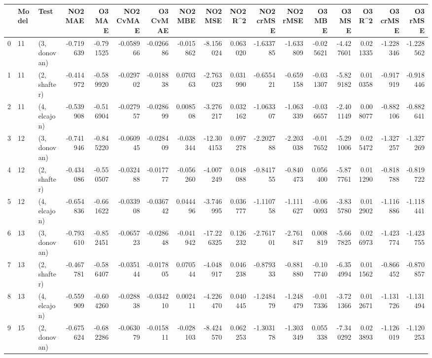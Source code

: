 \begin{tabular}{lllrrrrrrrrrrrrrr}
\toprule
{} & Model &          Test &   NO2 MAE &    O3 MAE &  NO2 CvMAE &  O3 CvMAE &   NO2 MBE &    NO2 MSE &   NO2 R\textasciicircum2 &  NO2 crMSE &  NO2 rMSE &    O3 MBE &     O3 MSE &    O3 R\textasciicircum2 &  O3 crMSE &   O3 rMSE \\
\midrule
0  &    11 &  (3, donovan) & -0.719639 & -0.791525 &  -0.058966 & -0.026686 & -0.015862 &  -8.156024 &  0.063020 &  -1.633785 & -1.633809 & -0.025621 &  -4.427601 &  0.021335 & -1.228346 & -1.228562 \\
1  &    11 &  (2, shafter) & -0.414972 & -0.589920 &  -0.029702 & -0.018838 &  0.070363 &  -2.763023 &  0.031990 &  -0.655421 & -0.659158 & -0.031307 &  -5.829182 &  0.010358 & -0.917919 & -0.918446 \\
2  &    11 &  (4, elcajon) & -0.539908 & -0.516904 &  -0.027957 & -0.028699 &  0.008508 &  -3.276217 &  0.032162 &  -1.063307 & -1.063339 & -0.036657 &  -2.401149 &  0.008077 & -0.882106 & -0.882641 \\
3  &    12 &  (3, donovan) & -0.741946 & -0.845220 &  -0.060945 & -0.028409 & -0.038344 & -12.304153 &  0.097278 &  -2.202788 & -2.203038 & -0.017652 &  -5.291006 &  0.025472 & -1.327257 & -1.327269 \\
4  &    12 &  (2, shafter) & -0.434086 & -0.550507 &  -0.032488 & -0.017777 & -0.056260 &  -4.007249 &  0.048088 &  -0.841755 & -0.840473 &  0.056400 &  -5.877761 &  0.011290 & -0.818788 & -0.819722 \\
5  &    12 &  (4, elcajon) & -0.654836 & -0.661622 &  -0.033908 & -0.036742 &  0.044496 &  -3.746995 &  0.036777 &  -1.110758 & -1.111627 & -0.060093 &  -3.835780 &  0.012902 & -1.116886 & -1.118441 \\
6  &    13 &  (3, donovan) & -0.793610 & -0.852451 &  -0.065723 & -0.028648 & -0.041942 & -17.226325 &  0.126232 &  -2.761701 & -2.761847 &  0.008819 &  -5.667825 &  0.026973 & -1.423774 & -1.423755 \\
7  &    13 &  (2, shafter) & -0.467781 & -0.586407 &  -0.035144 & -0.017805 &  0.070544 &  -4.048917 &  0.046238 &  -0.879333 & -0.881880 & -0.107740 &  -6.354994 &  0.011562 & -0.866452 & -0.870857 \\
8  &    13 &  (4, elcajon) & -0.559909 & -0.604260 &  -0.028838 & -0.034210 &  0.002411 &  -4.226470 &  0.040445 &  -1.248479 & -1.248479 & -0.017336 &  -3.721366 &  0.012671 & -1.131726 & -1.131494 \\
9  &    15 &  (2, donovan) & -0.675624 & -0.682286 &  -0.063079 & -0.015811 & -0.028103 &  -8.424570 &  0.062253 &  -1.303178 & -1.303349 &  0.055338 &  -7.340292 &  0.023893 & -1.126019 & -1.120253 \\

\end{tabular}
